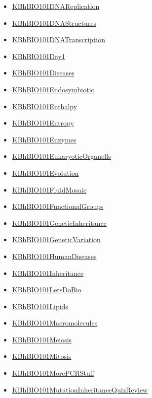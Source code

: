 \documentclass[11pt]{article}
\begin{document}
\begin{itemize}
\begin{itemize}
\item \href{bio101/KBhBIO101DNAReplication.org}{KBhBIO101DNAReplication}
\item \href{bio101/KBhBIO101DNAStructures.org}{KBhBIO101DNAStructures}
\item \href{bio101/KBhBIO101DNATranscription.org}{KBhBIO101DNATranscription}
\item \href{bio101/KBhBIO101Day1.org}{KBhBIO101Day1}
\item \href{bio101/KBhBIO101Diseases.org}{KBhBIO101Diseases}
\item \href{bio101/KBhBIO101Endosymbiotic.org}{KBhBIO101Endosymbiotic}
\item \href{bio101/KBhBIO101Enthalpy.org}{KBhBIO101Enthalpy}
\item \href{bio101/KBhBIO101Entropy.org}{KBhBIO101Entropy}
\item \href{bio101/KBhBIO101Enzymes.org}{KBhBIO101Enzymes}
\item \href{bio101/KBhBIO101EukaryoticOrganells.org}{KBhBIO101EukaryoticOrganells}
\item \href{bio101/KBhBIO101Evolution.org}{KBhBIO101Evolution}
\item \href{bio101/KBhBIO101FluidMosaic.org}{KBhBIO101FluidMosaic}
\item \href{bio101/KBhBIO101FunctionalGroups.org}{KBhBIO101FunctionalGroups}
\item \href{bio101/KBhBIO101GeneticInheritance.org}{KBhBIO101GeneticInheritance}
\item \href{bio101/KBhBIO101GeneticVariation.org}{KBhBIO101GeneticVariation}
\item \href{bio101/KBhBIO101HumanDiseases.org}{KBhBIO101HumanDiseases}
\item \href{bio101/KBhBIO101Inheritance.org}{KBhBIO101Inheritance}
\item \href{bio101/KBhBIO101LetsDoBio.org}{KBhBIO101LetsDoBio}
\item \href{bio101/KBhBIO101Lipids.org}{KBhBIO101Lipids}
\item \href{bio101/KBhBIO101Macromolecules.org}{KBhBIO101Macromolecules}
\item \href{bio101/KBhBIO101Meiosis.org}{KBhBIO101Meiosis}
\item \href{bio101/KBhBIO101Mitosis.org}{KBhBIO101Mitosis}
\item \href{bio101/KBhBIO101MorePCRStuff.org}{KBhBIO101MorePCRStuff}
\item \href{bio101/KBhBIO101MutationInheritanceQuizReview.org}{KBhBIO101MutationInheritanceQuizReview}

\end{itemize}
\end{itemize}
\end{document}
